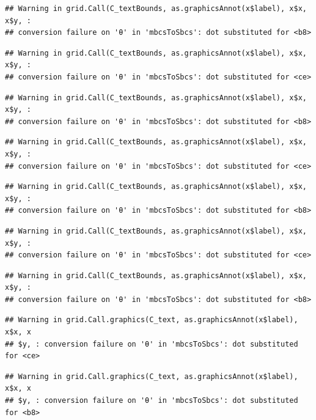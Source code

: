 \documentclass[]{book}
\theoremstyle{definition}
\theoremstyle{definition}
\theoremstyle{definition}
\theoremstyle{remark}
\begin{document}
\begin{verbatim}
## Warning in grid.Call(C_textBounds, as.graphicsAnnot(x$label), x$x, x$y, :
## conversion failure on 'θ' in 'mbcsToSbcs': dot substituted for <b8>
\end{verbatim}

\begin{verbatim}
## Warning in grid.Call(C_textBounds, as.graphicsAnnot(x$label), x$x, x$y, :
## conversion failure on 'θ' in 'mbcsToSbcs': dot substituted for <ce>
\end{verbatim}

\begin{verbatim}
## Warning in grid.Call(C_textBounds, as.graphicsAnnot(x$label), x$x, x$y, :
## conversion failure on 'θ' in 'mbcsToSbcs': dot substituted for <b8>
\end{verbatim}

\begin{verbatim}
## Warning in grid.Call(C_textBounds, as.graphicsAnnot(x$label), x$x, x$y, :
## conversion failure on 'θ' in 'mbcsToSbcs': dot substituted for <ce>
\end{verbatim}

\begin{verbatim}
## Warning in grid.Call(C_textBounds, as.graphicsAnnot(x$label), x$x, x$y, :
## conversion failure on 'θ' in 'mbcsToSbcs': dot substituted for <b8>
\end{verbatim}

\begin{verbatim}
## Warning in grid.Call(C_textBounds, as.graphicsAnnot(x$label), x$x, x$y, :
## conversion failure on 'θ' in 'mbcsToSbcs': dot substituted for <ce>
\end{verbatim}

\begin{verbatim}
## Warning in grid.Call(C_textBounds, as.graphicsAnnot(x$label), x$x, x$y, :
## conversion failure on 'θ' in 'mbcsToSbcs': dot substituted for <b8>
\end{verbatim}

\begin{verbatim}
## Warning in grid.Call.graphics(C_text, as.graphicsAnnot(x$label), x$x, x
## $y, : conversion failure on 'θ' in 'mbcsToSbcs': dot substituted for <ce>
\end{verbatim}

\begin{verbatim}
## Warning in grid.Call.graphics(C_text, as.graphicsAnnot(x$label), x$x, x
## $y, : conversion failure on 'θ' in 'mbcsToSbcs': dot substituted for <b8>
\end{verbatim}
\end{document}

